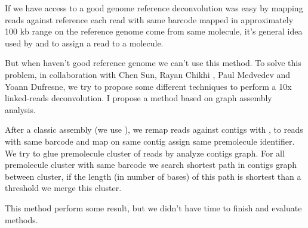 \documentclass[main.tex]{subfiles}
\begin{document}
If we have access to a good genome reference deconvolution was easy by mapping reads against reference each read with same barcode mapped in approximately 100 kb range on the reference genome come from same molecule, it's general idea used by \cite{ema} and \cite{lariat} to assign a read to a molecule.

But when haven't good reference genome we can't use this method. To solve this problem, in collaboration with Chen Sun, Rayan Chikhi , Paul Medvedev and Yoann Dufresne, we try to propose some different techniques to perform a 10x linked-reads deconvolution. I propose a method based on graph assembly analysis.

After a classic \DBG assembly (we use ), we remap reads against contigs with , to reads with same barcode and map on same contig  assign same premolecule identifier. We try to glue premolecule cluster of reads by analyze contigs graph. For all premolecule cluster with same barcode we search shortest path in contigs graph between cluster, if the length (in number of bases) of this path is shortest than a threshold we merge this cluster. 

This method perform some result, but we didn't have time to finish and evaluate methods.

\end{document}
